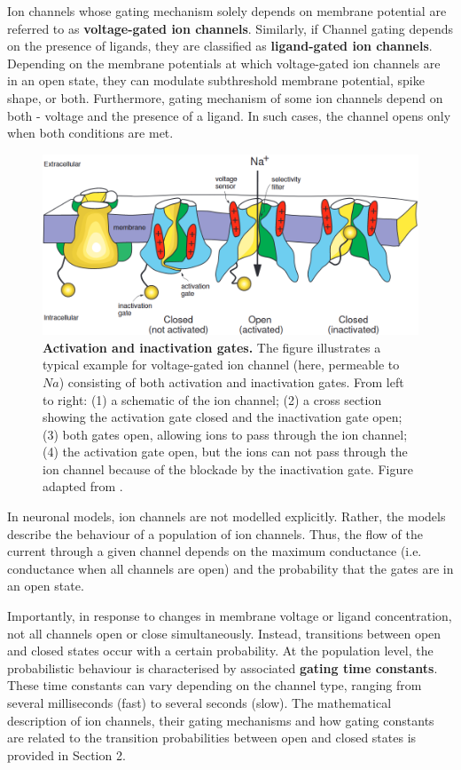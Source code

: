\documentclass[../main.tex]{subfiles}
\begin{document}
Ion channels whose gating mechanism solely depends on membrane potential are referred to as \textbf{voltage-gated ion channels}. Similarly, if Channel gating depends on the presence of ligands, they are classified as \textbf{ligand-gated ion channels}. Depending on the membrane potentials at which voltage-gated ion channels are in an open state, they can modulate subthreshold membrane potential, spike shape, or both. Furthermore, gating mechanism of some ion channels depend on both - voltage and the presence of a ligand. In such cases, the channel opens only when both conditions are met.

\begin{figure}[!t]
    \centering
    \includegraphics[width=0.85\linewidth]{../img/sleep_and_r5_network/structure_of_v_gated_channels.png}
    \caption[Activation and inactivation gates]{
        \textbf{Activation and inactivation gates.}
        The figure illustrates a typical example for voltage-gated ion channel (here, permeable to $Na$) consisting of both activation and inactivation gates. From left to right: (1) a schematic of the ion channel; (2) a cross section showing the activation gate closed and the inactivation gate open; (3) both gates open, allowing ions to pass through the ion channel; (4) the activation gate open, but the ions can not pass through the ion channel because of the blockade by the inactivation gate.
        Figure adapted from \cite{izhikevichDynamicalSystemsNeuroscience2006}.
    }
    \label{fig:voltage_gated_channel_structure}
\end{figure}

In neuronal models, ion channels are not modelled explicitly. Rather, the models describe the behaviour of a population of ion channels. Thus, the flow of the current through a given channel depends on the maximum conductance (i.e. conductance when all channels are open) and the probability that the gates are in an open state.%

Importantly, in response to changes in membrane voltage or ligand concentration, not all channels open or close simultaneously. Instead, transitions between open and closed states occur with a certain probability. At the population level, the probabilistic behaviour is characterised by associated \textbf{gating time constants}. These time constants can vary depending on the channel type, ranging from several milliseconds (fast) to several seconds (slow). The mathematical description of ion channels, their gating mechanisms and how gating constants are related
to the transition probabilities between open and closed states is provided in Section 2.
\end{document}
